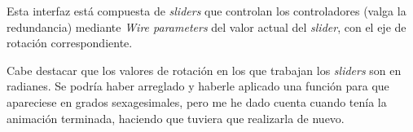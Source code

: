 Esta interfaz está compuesta de \textit{sliders} que controlan los controladores (valga la redundancia) mediante \textit{Wire parameters} del valor actual del \textit{slider}, con el eje de rotación correspondiente.

\bigskip

Cabe destacar que los valores de rotación en los que trabajan los \textit{sliders} son en radianes. Se podría haber arreglado y haberle aplicado una función para que apareciese en grados sexagesimales, pero me he dado cuenta cuando tenía la animación terminada, haciendo que tuviera que realizarla de nuevo.

\newpage